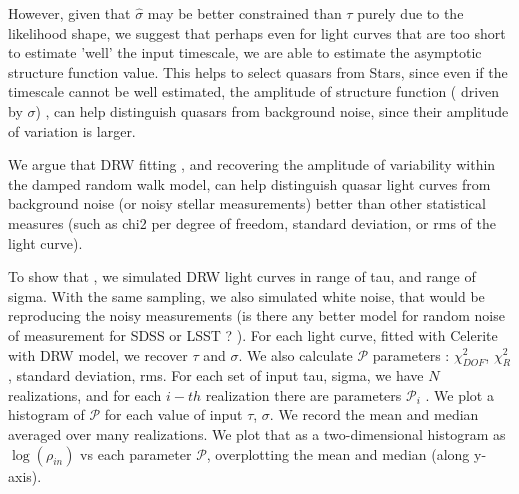 \documentclass[fleqn,usenatbib]{mnras}  %
\begin{document}
However,  given that $\hat{\sigma}$ may be better constrained than $\tau$ purely due to the likelihood shape,  we suggest that perhaps even for light curves that are too short to estimate 'well' the input timescale, we are able to estimate the asymptotic structure function value. This helps to select quasars from Stars, since even if the timescale cannot be well estimated,  the amplitude of structure function ( driven by $\sigma$) ,  can help distinguish quasars from background noise, since their amplitude of variation is larger. 

We argue that DRW fitting , and recovering the amplitude of variability within the damped random walk model, can help distinguish  quasar light curves from background noise (or noisy stellar measurements) better than other statistical measures (such as chi2 per degree of freedom, standard deviation,  or rms of the light curve).  

To show that ,  we  simulated  DRW light curves in range of tau, and range of sigma.  With the same sampling, we also simulated white noise, that would be reproducing the  noisy measurements (is there any better model for random noise of measurement  for SDSS  or LSST  ? ). For each light curve, fitted with Celerite with DRW model,  we recover $\tau$ and $\sigma$.  We also calculate $\mathcal{P}$ parameters : $\chi^{2}_{DOF}$, $\chi^{2}_{R}$, standard deviation,  rms.  For each set of input tau, sigma,  we have $N$ realizations, and for each $i-th$ realization there are parameters  $\mathcal{P}_{i}$ . We plot a histogram of $\mathcal{P}$ for each value of input $\tau$, $\sigma$. We record the mean and median averaged over many realizations. We plot that as  a two-dimensional histogram as  $\log{(\rho_{in})}$  vs each parameter $\mathcal{P}$, overplotting the mean and median (along y-axis). 


 









\bsp	%
\label{lastpage}
\end{document}
